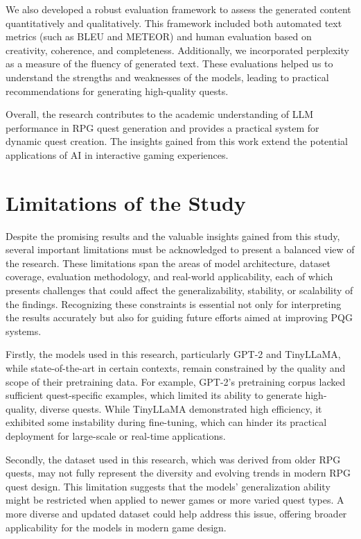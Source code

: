 We also developed a robust evaluation framework to assess the generated content
quantitatively and qualitatively. This framework included both automated text metrics
(such as BLEU and METEOR) and human evaluation based on creativity, coherence, and
completeness. Additionally, we incorporated perplexity as a measure of the fluency of
generated text. These evaluations helped us to understand the strengths and weaknesses
of the models, leading to practical recommendations for generating high-quality quests.

Overall, the research contributes to the academic understanding of LLM performance
in RPG quest generation and provides a practical system for dynamic quest creation.
The insights gained from this work extend the potential applications of AI in interactive
gaming experiences.

\section{Limitations of the Study}

Despite the promising results and the valuable insights gained from this study, several
important limitations must be acknowledged to present a balanced view of the research.
These limitations span the areas of model architecture, dataset coverage, evaluation
methodology, and real-world applicability, each of which presents challenges that could
affect the generalizability, stability, or scalability of the findings. Recognizing these constraints
is essential not only for interpreting the results accurately but also for guiding
future efforts aimed at improving PQG systems.

Firstly, the models used in this research, particularly GPT-2 and TinyLLaMA, while
state-of-the-art in certain contexts, remain constrained by the quality and scope of their
pretraining data. For example, GPT-2's pretraining corpus lacked sufficient quest-specific
examples, which limited its ability to generate high-quality, diverse quests. While TinyLLaMA
demonstrated high efficiency, it exhibited some instability during fine-tuning, which can hinder its practical deployment for large-scale or real-time applications.

Secondly, the dataset used in this research, which was derived from older RPG quests,
may not fully represent the diversity and evolving trends in modern RPG quest design.
This limitation suggests that the models' generalization ability might be restricted when
applied to newer games or more varied quest types. A more diverse and updated dataset
could help address this issue, offering broader applicability for the models in modern game
design.

